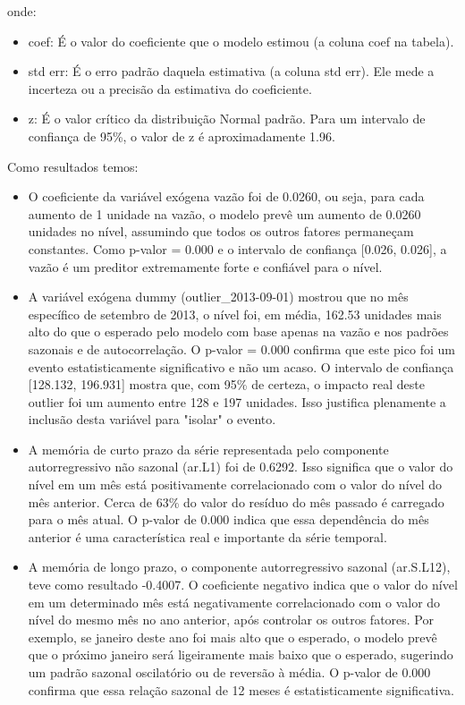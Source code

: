 \documentclass[ 12pt,a4paper ]{article} %
\begin{document}
	 onde:
	 \begin{itemize}
	 
	 
	 	\item coef: É o valor do coeficiente que o modelo estimou (a coluna coef na tabela).
	 	\item std err: É o erro padrão daquela estimativa (a coluna std err). Ele mede a incerteza ou a precisão da estimativa do coeficiente.
		\item  z: É o valor crítico da distribuição Normal padrão. Para um intervalo de confiança de 95\%, o valor de z é aproximadamente 1.96.
	\end{itemize}
	Como resultados temos: 
	
	\begin{itemize}
		\item O coeficiente da variável exógena vazão foi de 0.0260, ou seja, para cada aumento de 1 unidade na vazão, o modelo prevê um aumento de 0.0260 unidades no nível, assumindo que todos os outros fatores permaneçam constantes. Como p-valor = 0.000 e o intervalo de confiança [0.026, 0.026], a vazão é um preditor extremamente forte e confiável para o nível.
		
		\item A variável exógena dummy (outlier\_2013-09-01) mostrou que no mês específico de setembro de 2013, o nível foi, em média, 162.53 unidades mais alto do que o esperado pelo modelo com base apenas na vazão e nos padrões sazonais e de autocorrelação. O p-valor = 0.000 confirma que este pico foi um evento estatisticamente significativo e não um acaso. O intervalo de confiança [128.132, 196.931] mostra que, com 95\% de certeza, o impacto real deste outlier foi um aumento entre 128 e 197 unidades. Isso justifica plenamente a inclusão desta variável para "isolar" o evento.
		
		\item A memória de curto prazo da série representada pelo componente autorregressivo não sazonal (ar.L1) foi de 0.6292. Isso significa que o valor do nível em um mês está positivamente correlacionado com o valor do nível do mês anterior. Cerca de 63\% do valor do resíduo do mês passado é carregado para o mês atual. O p-valor de 0.000 indica que essa dependência do mês anterior é uma característica real e importante da série temporal.
		
		\item A memória de longo prazo, o componente autorregressivo sazonal (ar.S.L12), teve como resultado -0.4007. O coeficiente negativo indica que o valor do nível em um determinado mês está negativamente correlacionado com o valor do nível do mesmo mês no ano anterior, após controlar os outros fatores. Por exemplo, se janeiro deste ano foi mais alto que o esperado, o modelo prevê que o próximo janeiro será ligeiramente mais baixo que o esperado, sugerindo um padrão sazonal oscilatório ou de reversão à média.
		O p-valor de 0.000 confirma que essa relação sazonal de 12 meses é estatisticamente significativa.
		

\end{itemize}
\end{document}

